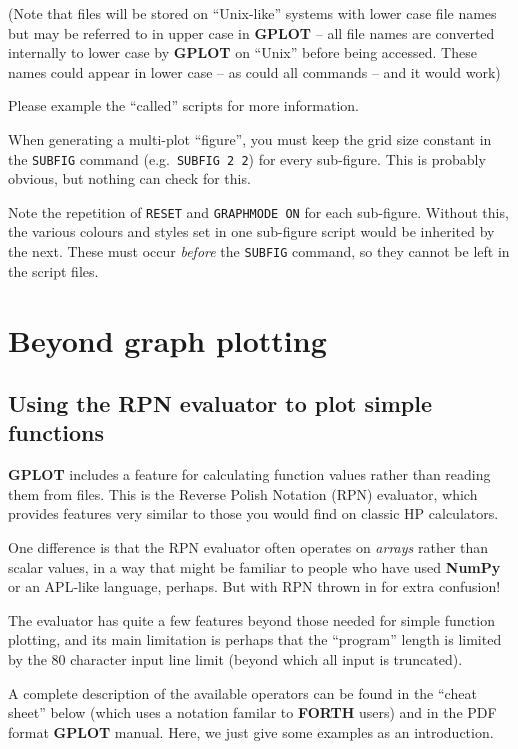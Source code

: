 \documentclass[a4paper,twoside,11pt]{article}
\newcommand{\newpara}{\par\vspace{4mm}\noindent}
\begin{document}
\newpara
(Note that files will be stored on ``Unix-like'' systems with lower case
file names but may be referred to in upper case in \textbf{GPLOT} -- all file
names are converted internally to lower case by \textbf{GPLOT} on ``Unix'' before
being accessed. These names could appear in lower case -- as could all
commands -- and it would work)

\newpara
Please example the ``called'' scripts for more information.

\newpara
When generating a multi-plot ``figure'', you must keep the grid size
constant in the \texttt{SUBFIG} command (e.g.~\texttt{SUBFIG\ 2\ 2}) for
every sub-figure. This is probably obvious, but nothing can check for
this.

\newpara
Note the repetition of \texttt{RESET} and \texttt{GRAPHMODE\ ON} for
each sub-figure. Without this, the various colours and styles set in one
sub-figure script would be inherited by the next. These must occur
\emph{before} the \texttt{SUBFIG} command, so they cannot be left in the
script files.

\section{Beyond graph plotting}

\subsection{Using the RPN evaluator to plot simple functions}\label{using-the-rpn-evaluator-to-plot-simple-functions}

\newpara
\textbf{GPLOT} includes a feature for calculating function values rather than
reading them from files. This is the Reverse Polish Notation (RPN)
evaluator, which provides features very similar to those you would find
on classic HP calculators.

\newpara
One difference is that the RPN evaluator often operates on \emph{arrays}
rather than scalar values, in a way that might be familiar to people who
have used \textbf{NumPy} or an APL-like language, perhaps. But with RPN thrown in
for extra confusion!

\newpara
The evaluator has quite a few features beyond those needed for simple
function plotting, and its main limitation is perhaps that the
``program'' length is limited by the 80 character input line limit
(beyond which all input is truncated).

\newpara
A complete description of the available operators can be found in the
``cheat sheet'' below (which uses a notation familar to \textbf{FORTH} users) and
in the PDF format \textbf{GPLOT} manual. Here, we just give some examples as an
introduction.
\end{document}
